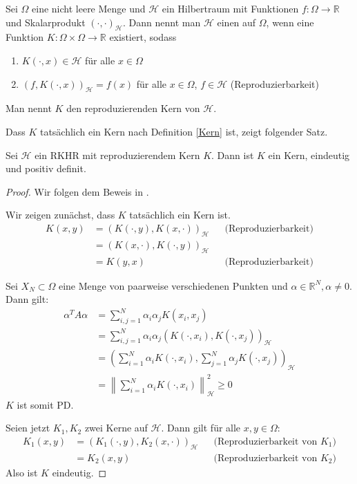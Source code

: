 \begin{definition}
Sei $\Omega$ eine nicht leere Menge und $\mathcal{H}$ ein Hilbertraum mit Funktionen $f:\Omega \rightarrow \mathbb{R}$ und Skalarprodukt $(\cdot, \cdot)_\mathcal{H}$. Dann nennt man $\mathcal{H}$ einen  auf $\Omega$, wenn eine Funktion $K:\Omega \times \Omega \rightarrow \mathbb{R}$ existiert, sodass
\begin{enumerate}
\item $K(\cdot, x) \in \mathcal{H}$ für alle $x \in \Omega$
\item $(f, K(\cdot,x))_\mathcal{H} = f(x)$ für alle $ x \in \Omega$, $f \in \mathcal{H}$ (Reproduzierbarkeit)
\end{enumerate}
Man nennt $K$ den reproduzierenden Kern von $\mathcal{H}$.
\end{definition}

Dass $K$ tatsächlich ein Kern nach Definition \ref{Kern} ist, zeigt folgender Satz.
\begin{theorem}
\label{thm:EindeutigkeitKern}
Sei $\mathcal{H}$ ein \gls{RKHR} mit reproduzierendem Kern $K$. Dann ist $K$ ein Kern, eindeutig und positiv definit.
\end{theorem}

\begin{proof}
Wir folgen dem Beweis in \textcite[Theorem 3.6]{Santin.2017}.

Wir zeigen zunächst, dass $K$ tatsächlich ein Kern ist.
\begin{align*}
K(x,y) &= \left( K(\cdot,y), K(x, \cdot)\right)_\mathcal{H} &&\text{(Reproduzierbarkeit)}\\
&= \left(K(x,\cdot), K(\cdot,y)\right)_\mathcal{H}\\
&= K(y,x) &&\text{(Reproduzierbarkeit)}
\end{align*}

Sei $X_N \subset \Omega$ eine Menge von paarweise verschiedenen Punkten und $\alpha \in \mathbb{R}^N, \alpha \neq 0$. Dann gilt:
\begin{align*}
\alpha^T A \alpha &= \sum_{i,j=1}^N \alpha_i \alpha_j K(x_i, x_j)\\
&= \sum_{i,j=1}^N \alpha_i \alpha_j \left(K(\cdot, x_i), K(\cdot,x_j)\right)_\mathcal{H}\\
&= \left(\sum_{i=1}^N \alpha_i K(\cdot,x_i), \sum_{j=1}^N \alpha_j K(\cdot, x_j)\right)_\mathcal{H}\\
&= \left\| \sum_{i=1}^N \alpha_i K(\cdot,x_i)\right\|_\mathcal{H}^2 \geq 0
\end{align*}
$K$ ist somit \ac{PD}.

Seien jetzt $K_1, K_2$ zwei Kerne auf $\mathcal{H}$. Dann gilt für alle $x,y \in \Omega$:
\begin{align*}
K_1(x,y) &= (K_1(\cdot,y), K_2(x, \cdot))_\mathcal{H} &&\text{(Reproduzierbarkeit von }K_1\text{)}\\
&= K_2(x,y) &&\text{(Reproduzierbarkeit von }K_2\text{)}
\end{align*}
Also ist $K$ eindeutig.
\end{proof}

